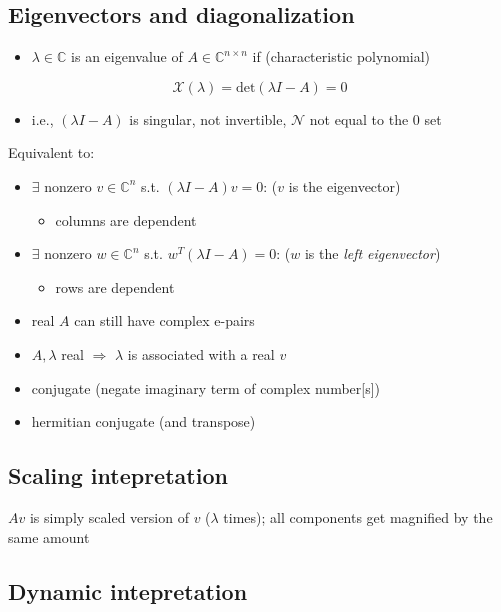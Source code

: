 \documentclass[10pt,letterpaper]{article}
\begin{document}
\subsection{Eigenvectors and diagonalization}
\label{sec-10_2}

\begin{itemize}
\item $\lambda \in \mathbb C$ is an eigenvalue of $A \in \mathbb C ^{n\times n}$ if (characteristic polynomial)
\end{itemize}
$$
\mathcal X(\lambda) = \text{det}(\lambda I-A) = 0
$$
\begin{itemize}
\item i.e., $(\lambda I-A)$ is singular, not invertible, $\mathcal{N}$ not equal to the 0 set
\end{itemize}
Equivalent to:
\begin{itemize}
\item $\exists$ nonzero $v \in \mathbb C ^{n}$ s.t. $(\lambda I -A) v = 0$:  ($v$ is the eigenvector)

\begin{itemize}
\item columns are dependent
\end{itemize}

\item $\exists$ nonzero $w \in \mathbb C ^{n}$ s.t. $w ^{T} (\lambda I -A) = 0$:  ($w$ is the \emph{left eigenvector})

\begin{itemize}
\item rows are dependent
\end{itemize}

\item real $A$ can still have complex e-pairs
\item $A,\lambda$ real $\Rightarrow$ $\lambda$ is associated with a real $v$
\item conjugate (negate imaginary term of complex number[s])
\item hermitian conjugate (and transpose)
\end{itemize}
\subsection{Scaling intepretation}
\label{sec-10_3}

$Av$ is simply scaled version of $v$ ($\lambda$ times); all components get magnified by the same amount
\subsection{Dynamic intepretation}
\label{sec-10_4}
\end{document}
